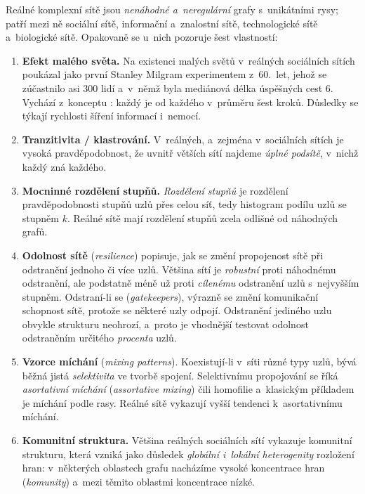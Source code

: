 \documentclass[11pt,a4paper]{article}
\theoremstyle{definition}
\begin{document}
\begin{defbox}
Reálné komplexní sítě jsou \emph{nenáhodné a~neregulární} grafy s~unikátními rysy; patří mezi
ně sociální sítě, informační a~znalostní sítě, technologické sítě a~biologické sítě.
Opakovaně se u~nich pozoruje šest vlastností:
\begin{enumerate}
\item \textbf{Efekt malého světa.} Na existenci malých světů v~reálných sociálních sítích
      poukázal jako první Stanley Milgram experimentem z~60.~let, jehož se zúčastnilo asi 300
      lidí a~v~němž byla mediánová délka úspěšných cest 6. Vychází z~konceptu : každý je od každého v~průměru šest kroků. Důsledky se týkají rychlosti
      šíření informací i~nemocí.
\item \textbf{Tranzitivita / klastrování.} V~reálných, a~zejména v~sociálních sítích je
      vysoká pravděpodobnost, že uvnitř větších sítí najdeme \emph{úplné podsítě}, v~nichž
      každý zná každého.
\item \textbf{Mocninné rozdělení stupňů.} \emph{Rozdělení stupňů} je rozdělení
      pravděpodobnosti stupňů uzlů přes celou síť, tedy histogram podílu uzlů se stupněm $k$.
      Reálné sítě mají rozdělení stupňů zcela odlišné od náhodných grafů.
\item \textbf{Odolnost sítě} (\emph{resilience}) popisuje, jak se změní propojenost sítě při
      odstranění jednoho či více uzlů. Většina sítí je \emph{robustní} proti náhodnému
      odstranění, ale podstatně méně už proti \emph{cílenému} odstranění uzlů s~nejvyšším
      stupněm. Odstraní-li se  (\emph{gatekeepers}), výrazně se změní komunikační
      schopnost sítě, protože se některé uzly odpojí. Odstranění jediného uzlu obvykle
      strukturu neohrozí, a~proto je vhodnější testovat odolnost odstraněním určitého
      \emph{procenta} uzlů.
\item \textbf{Vzorce míchání} (\emph{mixing patterns}). Koexistují-li v~síti různé typy uzlů,
      bývá běžná jistá \emph{selektivita} ve tvorbě spojení. Selektivnímu propojování se říká
      \emph{asortativní míchání} (\emph{assortative mixing}) čili homofilie a~klasickým
      příkladem je míchání podle rasy. Reálné sítě vykazují vyšší tendenci k~asortativnímu
      míchání.
\item \textbf{Komunitní struktura.} Většina reálných sociálních sítí vykazuje komunitní
      strukturu, která vzniká jako důsledek \emph{globální i~lokální heterogenity} rozložení
      hran: v~některých oblastech grafu nacházíme vysoké koncentrace hran (\emph{komunity})
      a~mezi těmito oblastmi koncentrace nízké.
\end{enumerate}
\end{defbox}
\end{document}

